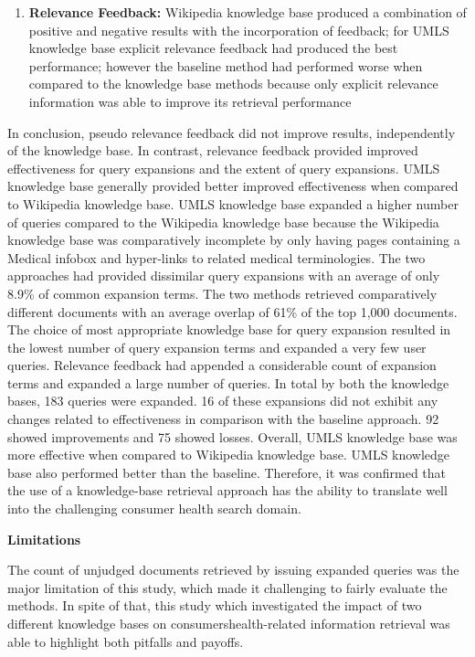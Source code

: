 \documentclass[]{article}
\begin{document}
\begin{enumerate}
\begin{enumerate}
	\item \textbf{Relevance Feedback:} Wikipedia knowledge base produced a combination of positive and negative results with the incorporation of feedback; for UMLS knowledge base explicit relevance feedback had produced the best performance; however the baseline method had performed worse when compared to the knowledge base methods because only explicit relevance information was able to improve its retrieval performance 
	   
\end{enumerate} 

In conclusion, pseudo relevance feedback did not improve results, independently of the knowledge base. In contrast, relevance feedback provided improved effectiveness for query expansions and the extent of query expansions. UMLS knowledge base generally provided better improved effectiveness when compared to Wikipedia knowledge base. UMLS knowledge base expanded a higher number of queries compared to the Wikipedia knowledge base because the Wikipedia knowledge base was comparatively incomplete by only having pages containing a Medical infobox and hyper-links to related medical terminologies. The two approaches had provided dissimilar query expansions with an average of only 8.9\% of common expansion terms. The two methods retrieved comparatively different documents with an average overlap of 61\% of the top 1,000 documents. The choice of most appropriate knowledge base for query expansion resulted in the lowest number of query expansion terms and expanded a very few user queries. Relevance feedback had appended a considerable count of expansion terms and expanded a large number of queries.  In total by both the knowledge bases, 183 queries were expanded. 16 of these expansions did not exhibit any changes related to effectiveness in comparison with the baseline approach. 92 showed improvements and 75 showed losses. Overall, UMLS knowledge base was more effective when compared to Wikipedia knowledge base. UMLS knowledge base also performed better than the baseline. Therefore, it was confirmed that the use of a knowledge-base retrieval approach has the ability to translate well into the challenging consumer health search domain.                 

\textbf{Limitations}

The count of unjudged documents retrieved by issuing expanded queries was the major limitation of this study, which made it challenging to fairly evaluate the methods. In spite of that, this study which investigated the impact of two different knowledge bases on consumers\textquotesingle health-related information retrieval was able to highlight both pitfalls and payoffs. 


\end{enumerate}
\end{document}
